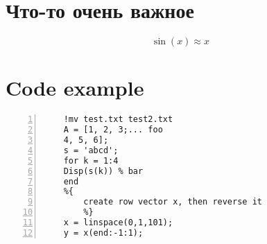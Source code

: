 \chapter{Что-то очень важное}
\label{app:details}

\[
    \sin(x) \approx x
\]


\chapter{Code example}

\begin{lstlisting}[style=Matlab-editor, frame=single, numbers=left,]
	%% Пример кода Matlab
	!mv test.txt test2.txt
	A = [1, 2, 3;... foo
	4, 5, 6];
	s = 'abcd';
	for k = 1:4
	Disp(s(k)) % bar
	end
	%{
		create row vector x, then reverse it
		%}
	x = linspace(0,1,101);
	y = x(end:-1:1);
\end{lstlisting}
